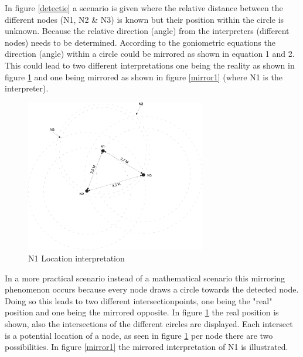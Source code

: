 \documentclass[10pt,a4paper]{article}
\begin{document}
In figure \ref{detectie} a scenario is given where the relative distance between the different nodes (N1, N2 \& N3) is known but their position within the circle is unknown. Because the relative direction (angle) from the interpreters (different nodes) needs to be determined. According to the goniometric equations the direction (angle) within a circle could be mirrored as shown in equation 1 and 2. This could lead to two different interpretations one being the reality as shown in figure \ref{mirror} and one being mirrored as shown in figure \ref{mirror1} (where N1 is the interpreter). 

\begin{figure}[H]
\centering
\includegraphics[width=0.7\textwidth]{Mirror1.pdf}
\caption{N1 Location interpretation}
\label{mirror}
\end{figure}

In a more practical scenario instead of a mathematical scenario this mirroring phenomenon occurs because every node draws a circle towards the detected node. Doing so this leads to two different intersectionpoints, one being the "real" position and one being the mirrored opposite. In figure \ref{mirror} the real position is shown, also the intersections of the different circles are displayed. Each intersect is a potential location of a node, as seen in figure \ref{mirror} per node there are two possibilities. In figure \ref{mirror1} the mirrored interpretation of N1 is illustrated.
 
\end{document}
